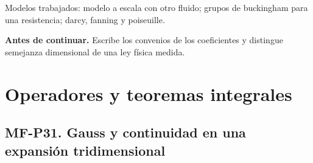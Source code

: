 \begin{tcolorbox}[studiumcheck,breakable=false,title={Síntesis y comprobación}]Modelos trabajados: modelo a escala con otro fluido; grupos de buckingham para una resistencia; darcy, fanning y poiseuille.\par\textbf{Antes de continuar.} Escribe los convenios de los coeficientes y distingue semejanza dimensional de una ley física medida.\end{tcolorbox}

\chapter{Operadores y teoremas integrales}


\Needspace{.30\textheight}\section{MF-P31. Gauss y continuidad en una expansión tridimensional}

